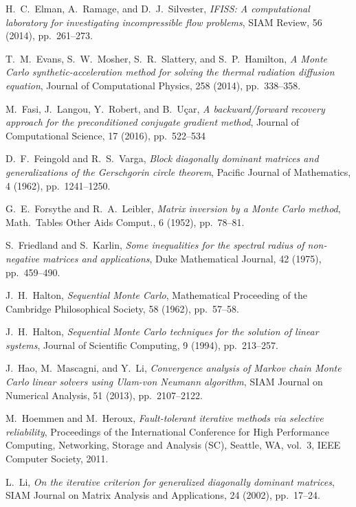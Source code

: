 \documentclass[times]{nlaauth}
\begin{document}
\begin{thebibliography}{99}
{\sc H.~C.~Elman, A.~Ramage, and D.~J.~Silvester},
{\em IFISS: A computational laboratory for investigating incompressible flow problems},
 SIAM Review, 56 (2014), pp.~261--273.

 {\sc T.~M.~Evans, S.~W.~Mosher, S.~R.~Slattery, and S.~P.~Hamilton},
 {\em A Monte Carlo synthetic-acceleration method for solving the thermal
 radiation diffusion equation},
 Journal of Computational Physics,
 258 (2014), pp.~338--358.

 {\sc M.~Fasi, J.~Langou, Y.~Robert, and B.~U\c car},
 {\em A backward/forward recovery approach for the preconditioned
  conjugate gradient method}, Journal of Computational Science, 17 (2016), pp.~522--534

{\sc D.~F.~Feingold and R.~S.~Varga},
  {\em Block diagonally dominant matrices and generalizations
   of the Gerschgorin circle theorem},
Pacific Journal of Mathematics, 4 (1962), pp.~1241--1250.

{\sc G.~E.~Forsythe and R.~A.~Leibler},
{\em Matrix inversion by a Monte Carlo method},
Math.~Tables Other Aids Comput., 6 (1952), pp.~78--81.

  {\sc S.~Friedland and S.~Karlin},
  {\em Some inequalities for the spectral radius of non-negative matrices
  and applications},
  Duke Mathematical Journal,
  42 (1975), pp.~459--490.

 {\sc J.~H.~Halton},
 {\em Sequential Monte Carlo},
 Mathematical Proceeding of the Cambridge Philosophical Society,
 58 (1962), pp.~57--58.

 {\sc J.~H.~Halton},
 {\em Sequential Monte Carlo techniques for the solution of linear
systems},
 Journal of Scientific Computing,
 9 (1994), pp.~213--257.

 {\sc J.~Hao, M.~Mascagni, and Y.~Li},
 {\em Convergence analysis of Markov chain Monte Carlo linear solvers using
Ulam-von Neumann algorithm},
 SIAM Journal on Numerical Analysis,
 51 (2013), pp.~2107--2122.

  {\sc M.~Hoemmen and M.~Heroux},
  {\em Fault-tolerant iterative methods via selective reliability},
  Proceedings of the International Conference for High Performance
Computing, Networking, Storage and Analysis (SC), Seattle, WA, vol.~3, IEEE Computer Society,
2011.

  {\sc L.~Li},
  {\em On the iterative criterion for generalized diagonally dominant
matrices},
  SIAM Journal on Matrix Analysis and Applications,
  24 (2002), pp.~17--24.


\end{thebibliography}
\end{document}
